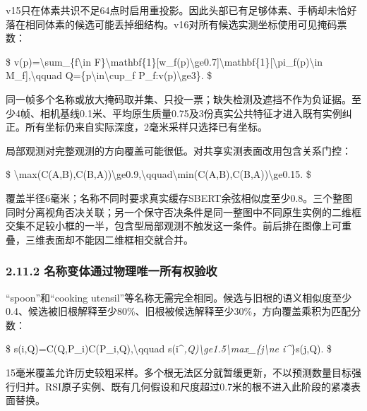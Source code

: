 \documentclass[UTF8,fontset=fandol]{ctexart}
\begin{document}
v15只在体素共识不足64点时启用重投影。因此头部已有足够体素、手柄却未恰好落在相同体素的候选可能丢掉细结构。v16对所有候选实测坐标使用可见掩码票数：



\$
v(p)=\textbackslash{}sum\_\{f\textbackslash{}in F\}\textbackslash{}mathbf\{1\}[w\_f(p)\textbackslash{}ge0.7]\textbackslash{}mathbf\{1\}[\textbackslash{}pi\_f(p)\textbackslash{}in M\_f],\textbackslash{}qquad Q=\{p\textbackslash{}in\textbackslash{}cup\_f P\_f:v(p)\textbackslash{}ge3\}.
\$



同一帧多个名称或放大掩码取并集、只投一票；缺失检测及遮挡不作为负证据。至少4帧、相机基线0.1米、平均原生质量0.75及3份真实公共特征才进入既有实例纠正。所有坐标仍来自实际深度，2毫米采样只选择已有坐标。



局部观测对完整观测的方向覆盖可能很低。对共享实测表面改用包含关系门控：



\$
\textbackslash{}max(C(A,B),C(B,A))\textbackslash{}ge0.9,\textbackslash{}qquad\textbackslash{}min(C(A,B),C(B,A))\textbackslash{}ge0.15.
\$



覆盖半径6毫米；名称不同时要求真实缓存SBERT余弦相似度至少0.8。三个整图同时分离视角否决关联；另一个保守否决条件是同一整图中不同原生实例的二维框交集不足较小框的一半，包含型局部观测不触发这一条件。前后排在图像上可重叠，三维表面却不能因二维框相交就合并。



\subsubsection*{2.11.2 名称变体通过物理唯一所有权验收}

“spoon”和“cooking utensil”等名称无需完全相同。候选与旧根的语义相似度至少0.4、候选被旧根解释至少80\%、旧根被候选解释至少30\%，方向覆盖乘积为匹配分数：



\$
s(i,Q)=C(Q,P\_i)C(P\_i,Q),\textbackslash{}qquad s(i\textasciicircum{}\emph{,Q)\textbackslash{}ge1.5\textbackslash{}max\_\{j\textbackslash{}ne i\textasciicircum{}}\}s(j,Q).
\$



15毫米覆盖允许历史较粗采样。多个根无法区分就暂缓更新，不以预测数量目标强行归并。RSI原子实例、既有几何假设和尺度超过0.7米的根不进入此阶段的紧凑表面替换。
\end{document}
